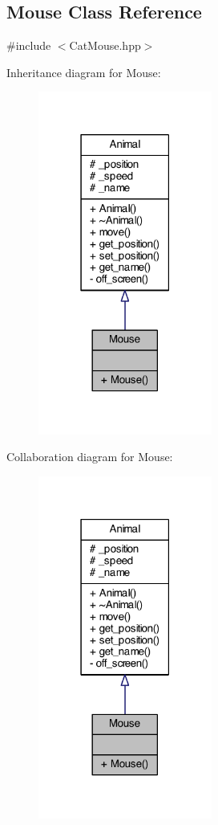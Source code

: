 \subsection{Mouse Class Reference}
\label{class_mouse}


{\ttfamily \#include $<$Cat\-Mouse.\-hpp$>$}



Inheritance diagram for Mouse\-:
\nopagebreak
\begin{figure}[H]
\begin{center}
\leavevmode
\includegraphics[width=162pt]{class_mouse__inherit__graph}
\end{center}
\end{figure}


Collaboration diagram for Mouse\-:
\nopagebreak
\begin{figure}[H]
\begin{center}
\leavevmode
\includegraphics[width=162pt]{class_mouse__coll__graph}
\end{center}
\end{figure}
